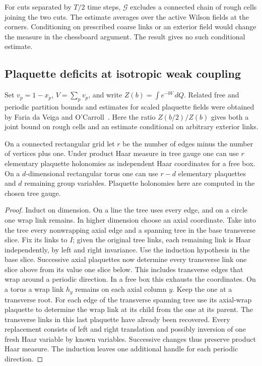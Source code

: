 For cuts separated by $T/2$ time steps, $\mathcal G$ excludes a connected
chain of rough cells joining the two cuts. The estimate averages over
the active Wilson fields at the corners. Conditioning on prescribed
coarse links or an exterior field would change the measure in the
chessboard argument. The result gives no such conditional estimate.

\subsection{Plaquette deficits at isotropic weak coupling}
\label{cl:sec:natural-roughness}
Set \(v_p=1-x_p\), \(V=\sum_p v_p\), and write \(Z(b)=\int e^{-bV}\,dQ\).
Related free and periodic partition bounds and estimates for scaled plaquette
fields were obtained by Faria da Veiga and O'Carroll~\cite{FO25}.
Here the ratio \(Z(b/2)/Z(b)\) gives both a joint bound on rough cells and
an estimate conditional on arbitrary exterior links.

\begin{lemma}\label{cl:lem:triangular-plaquettes}
On a connected rectangular grid let \(r\) be the number of edges minus
the number of vertices plus one. Under product Haar measure in tree gauge
one can use \(r\) elementary plaquette holonomies as independent Haar
coordinates for a free box. On a \(d\)-dimensional rectangular torus one
can use \(r-d\) elementary plaquettes and \(d\) remaining group variables.
Plaquette holonomies here are computed in the chosen tree gauge.
\end{lemma}
\begin{proof}
Induct on dimension. On a line the tree uses every edge, and on a circle
one wrap link remains. In higher dimension choose an axial coordinate.
Take into the tree every nonwrapping axial edge and a spanning tree
in the base transverse slice. Fix its links to \(I\); given the original
tree links, each remaining link is Haar independently, by left and
right invariance. Use the induction hypothesis in the base slice.
Successive axial plaquettes now determine every transverse link one slice
above from its value one slice below. This includes transverse edges
that wrap around a periodic direction. In a free box this exhausts the
coordinates. On a torus a wrap link \(h_y\) remains on each axial column
\(y\). Keep the one at a transverse root. For each edge of the transverse
spanning tree use its axial-wrap plaquette to determine the wrap link
at its child from the one at its parent. The transverse links in this last
plaquette have already been recovered. Every replacement consists of left
and right translation and possibly inversion of one fresh Haar variable
by known variables. Successive changes thus preserve product Haar measure.
The induction leaves one additional handle for each periodic direction.
\end{proof}

